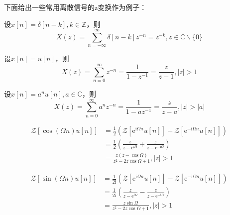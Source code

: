 下面给出一些常用离散信号的z变换作为例子：
\begin{example}[单位脉冲序列的z变换]
    设$x[n]=\delta[n-k],k\in\mathbb{Z}$，则
    \[X(z)=\sum_{n=-\infty}^{\infty}\delta[n-k]z^{-n}=z^{-k},z\in\mathbb{C}\backslash\{0\}\]
\end{example}
\begin{example}[单位阶跃序列的z变换]
    设$x[n]=u[n]$，则
    \[X(z)=\sum_{n=0}^{\infty}z^{-n}=\frac{1}{1-z^{-1}}=\frac{z}{z-1},|z|>1\]
\end{example}
\begin{example}[指数序列的z变换]
    设$x[n]=a^n u[n],a\in\mathbb{C}$，则
    \[X(z)=\sum_{n=0}^{\infty}a^n z^{-n}=\frac{1}{1-a z^{-1}}=\frac{z}{z-a},|z|>|a|\]
\end{example}
\begin{example}[单边余弦序列的z变换]
    \begin{align*}
        \mathcal{Z} \left[\cos(\Omega n)u[n]\right]&=\frac{1}{2}\left(\mathcal{Z} \left[\mathrm{e}^{\mathrm{i}\Omega n}u[n]\right]+\mathcal{Z} \left[\mathrm{e}^{-\mathrm{i}\Omega n}u[n]\right]\right)\\
        &=\frac{1}{2}\left(\frac{z}{z-\mathrm{e}^{\mathrm{i}\Omega}}+\frac{z}{z-\mathrm{e}^{-\mathrm{i}\Omega}}\right)\\
        &=\frac{z(z-\cos\Omega)}{z^2-2z\cos\Omega+1},|z|>1
    \end{align*}
\end{example}
\begin{example}[单边正弦序列的z变换]
    \begin{align*}
        \mathcal{Z} \left[\sin(\Omega n)u[n]\right]&=\frac{1}{2\mathrm{i}}\left(\mathcal{Z} \left[\mathrm{e}^{\mathrm{i}\Omega n}u[n]\right]-\mathcal{Z} \left[\mathrm{e}^{-\mathrm{i}\Omega n}u[n]\right]\right)\\
        &=\frac{1}{2\mathrm{i}}\left(\frac{z}{z-\mathrm{e}^{\mathrm{i}\Omega}}-\frac{z}{z-\mathrm{e}^{-\mathrm{i}\Omega}}\right)\\
        &=\frac{z\sin\Omega}{z^2-2z\cos\Omega+1},|z|>1
    \end{align*}
\end{example}

